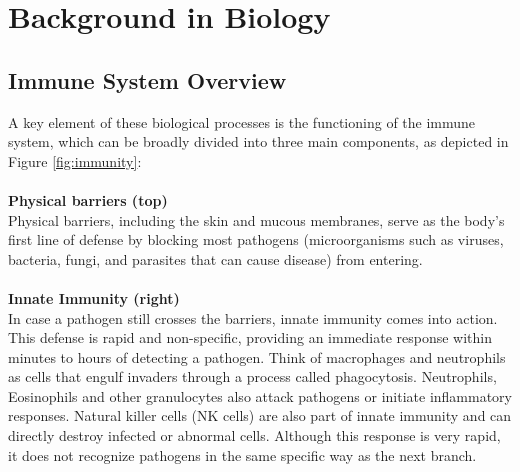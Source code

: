 \documentclass[12pt,a4paper]{report}
\begin{document}
\section{Background in Biology}

\subsection{Immune System Overview}


A key element of these biological processes is the functioning of the immune system, which can be broadly divided into three main components, as depicted in Figure \ref{fig:immunity}:\\
\\
\textbf{Physical barriers (top)}\\
Physical barriers, including the skin and mucous membranes, serve as the body’s first line of defense by blocking most pathogens (microorganisms such as viruses, bacteria, fungi, and parasites that can cause disease) from entering.\\
\\
\textbf{Innate Immunity (right)}\\
In case a pathogen still crosses the barriers, innate immunity comes into action. This defense is rapid and non-specific, providing an immediate response within minutes to hours of detecting a pathogen. Think of macrophages and neutrophils as cells that engulf invaders through a process called phagocytosis. Neutrophils, Eosinophils and other granulocytes also attack pathogens or initiate inflammatory responses. Natural killer cells (NK cells) are also part of innate immunity and can directly destroy infected or abnormal cells. Although this response is very rapid, it does not recognize pathogens in the same specific way as the next branch. \cite{janeway2001immunobiology}\\
\end{document}
